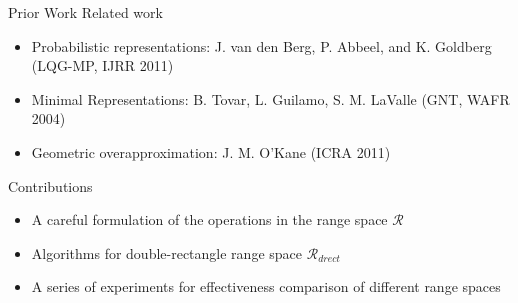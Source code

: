 \documentclass[10pt]{beamer}
\begin{document}
\begin{frame}{Prior Work}
Related work
\begin{itemize}
\item Probabilistic representations: J. van den Berg,
  P. Abbeel, and K. Goldberg (LQG-MP, IJRR 2011)
\item Minimal Representations: B. Tovar, L. Guilamo, S. M. LaValle (GNT, WAFR 2004)
\item Geometric overapproximation: J. M. O'Kane (ICRA 2011)
\end{itemize}
Contributions
\begin{itemize}
\item A careful formulation of the operations in the range space $\mathcal{R}$
\item Algorithms for double-rectangle range space $\mathcal{R}_{drect}$
\item A series of experiments for effectiveness comparison of different range spaces
\end{itemize}
\end{frame}
\end{document}
